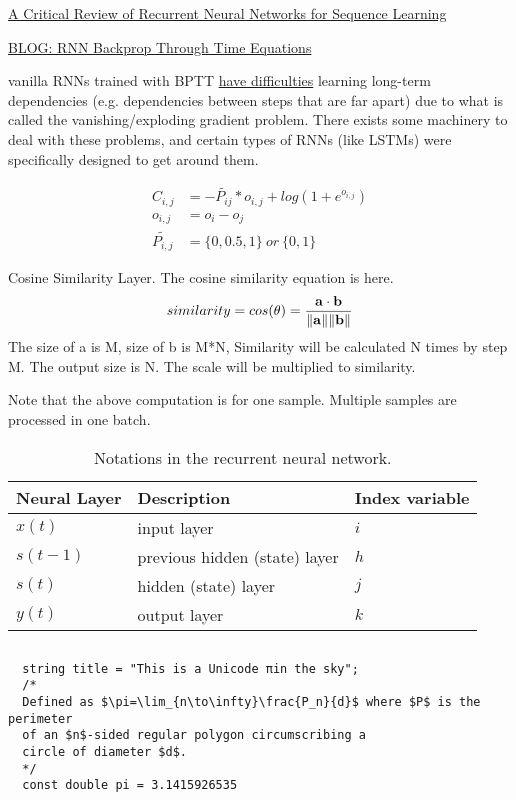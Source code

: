 \documentclass[10pt,a4paper]{ctexbook}
\begin{document}
\href{https://arxiv.org/abs/1506.00019}{A Critical Review of Recurrent Neural Networks for Sequence Learning}

\href{https://jramapuram.github.io/ramblings/rnn-backrpop/}{BLOG: RNN Backprop Through Time Equations}

vanilla RNNs trained with BPTT \href{http://www.jmlr.org/proceedings/papers/v28/pascanu13.pdf}{have difficulties} learning long-term dependencies (e.g. dependencies between steps that are far apart) due to what is called the vanishing/exploding gradient problem. There exists some machinery to deal with these problems, and certain types of RNNs (like LSTMs) were specifically designed to get around them.

\[
\begin{aligned}
C_{i,j} & = -\tilde{P_{ij}} * o_{i,j} + log(1 + e^{o_{i,j}})\\o_{i,j} & = o_i - o_j\\\tilde{P_{i,j}} & = \{0, 0.5, 1\} \ or \ \{0, 1\}
\end{aligned}
\]

Cosine Similarity Layer. The cosine similarity equation is here.
\[similarity = cos(\theta) = {\mathbf{a} \cdot \mathbf{b} \over \|\mathbf{a}\| \|\mathbf{b}\|}\]
The size of a is M, size of b is M*N, Similarity will be calculated N times by step M. The output size is N. The scale will be multiplied to similarity.

Note that the above computation is for one sample. Multiple samples are processed in one batch.

\begin{table}[H]
\centering
\begin{tabular}{|l|l|l|}
\hline
Neural Layer & Description & Index variable\\
\hline
$x(t)$ & input layer & $i$ \\
$s(t-1)$ & previous hidden (state) layer & $h$ \\
$s(t)$ & hidden (state) layer & $j$ \\
$y(t)$ & output layer & $k$ \\
\hline
\end{tabular}%
\caption{Notations in the recurrent neural network.}
\label{tab:rnn-notations}
\end{table}

\inputminted{python}{reference/code/bptt.py}

\begin{verbatim}
  string title = "This is a Unicode πin the sky";
  /*  
  Defined as $\pi=\lim_{n\to\infty}\frac{P_n}{d}$ where $P$ is the perimeter
  of an $n$-sided regular polygon circumscribing a
  circle of diameter $d$.
  */  
  const double pi = 3.1415926535
\end{verbatim}
\end{document}
